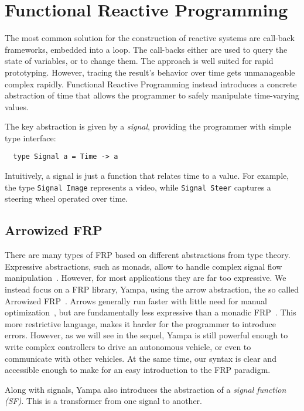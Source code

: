 \section{Functional Reactive Programming}

The most common solution for the construction of reactive systems are call-back frameworks, embedded into a loop.
The call-backs either are used to query the state of variables, or to change them.
The approach is well suited for rapid prototyping. 
However, tracing the result's behavior over time gets unmanageable complex rapidly.
Functional Reactive Programming instead introduces a concrete abstraction of time that allows the programmer to safely manipulate time-varying values.

The key abstraction is given by a \textit{signal}, providing the programmer with simple type interface:

\begin{lstlisting}
  type Signal a = Time -> a
\end{lstlisting}

\noindent Intuitively, a signal is just a function that relates time to a value.
For example, the type \texttt{Signal Image} represents a video, while \texttt{Signal Steer} captures a steering wheel operated over time.

\subsection{Arrowized FRP}

There are many types of FRP based on different abstractions from type theory.
Expressive abstractions, such as monads, allow to handle complex signal flow manipulation~\cite{van2014monadic}. However, for most applications they are far too expressive.
We instead focus on a FRP library, Yampa, using the arrow abstraction, the so called Arrowized FRP~\cite{hudak2003arrows}.
Arrows generally run faster with little need for manual optimization~\cite{yallop2016causal}, but are fundamentally less expressive than a monadic FRP~\cite{lindley2011idioms}.
This more restrictive language, makes it harder for the programmer to introduce errors.
However, as we will see in the sequel, Yampa is still powerful enough to write complex controllers to drive an autonomous vehicle, or even to communicate with other vehicles.
At the same time, our syntax is clear and accessible enough to make for an easy introduction to the FRP paradigm.

Along with signals, Yampa also introduces the abstraction of a \textit{signal function (SF)}.
This is a transformer from one signal to another.

